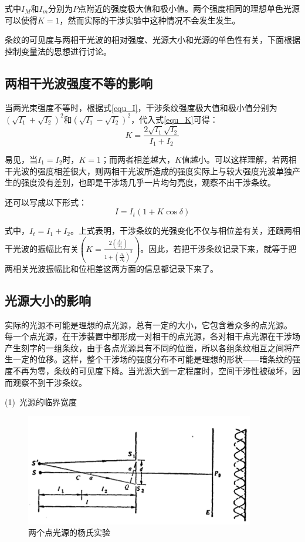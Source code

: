 \documentclass[UTF8]{ctexart}
\begin{document}
\noindent 式中$ I_{M} $和$ I_{m} $分别为$ P $点附近的强度极大值和极小值。两个强度相同的理想单色光源可以使得$ K=1 $，然而实际的干涉实验中这种情况不会发生发生。

	条纹的可见度与两相干光波的相对强度、光源大小和光源的单色性有关，下面根据控制变量法的思想进行讨论。
	
	\subsection{两相干光波强度不等的影响}
	当两光束强度不等时，根据式\ref{equ_I}，干涉条纹强度极大值和极小值分别为$ \left(\sqrt{I_{1}}+\sqrt{I_{2}}\right)^{2} $和$\left(\sqrt{I_{1}}-\sqrt{I_{2}}\right)^{2}$，代入式\ref{equ_K}可得：
	\begin{equation}
		K=\frac{2 \sqrt{I_{1}} \sqrt{I_{2}}}{I_{1}+I_{2}}
	\end{equation}
	
\noindent 易见，当$ I_{1}=I_{2} $时，$ K=1 $；而两者相差越大，$ K $值越小。可以这样理解，若两相干光波的强度相差很大，则两相干光波所造成的强度实际上与较大强度光波单独产生的强度没有差别，也即是干涉场几乎一片均匀亮度，观察不出干涉条纹。
	
	还可以写成以下形式：
	\begin{equation}
		I=I_{t}(1+K \cos \delta)
	\end{equation}
	
\noindent 式中，$ I_{t}=I_{1}+I_{2} $。上式表明，干涉条纹的光强变化不仅与相位差有关，还跟两相干光波的振幅比有关$ \left(K=\frac{2 \left(\frac{A_{1}}{A_{2}}\right)}{1+\left(\frac{A_{1}}{A_{2}}\right)^{2}}\right) $。因此，若把干涉条纹记录下来，就等于把两相关光波振幅比和位相差这两方面的信息都记录下来了。

	\subsection{光源大小的影响}
	实际的光源不可能是理想的点光源，总有一定的大小，它包含着众多的点光源。 每一个点光源，在干涉装置中都形成一对相干的点光源，各对相干点光源在干涉场产生刻字的一组条纹，由于各点光源具有不同的位置，所以各组条纹相互之间将产生一定的位移。这样，整个干涉场的强度分布不可能是理想的形状——暗条纹的强度不再为零，条纹的可见度下降。当光源大到一定程度时，空间干涉性被破坏，因而观察不到干涉条纹。
	
	(1)\ 光源的临界宽度
	
	\begin{figure}[h]
		\centering
		\includegraphics[width=10cm]{point_lights.png}
		\caption{两个点光源的杨氏实验}
		\label{figure_points}
	\end{figure}
\end{document}
